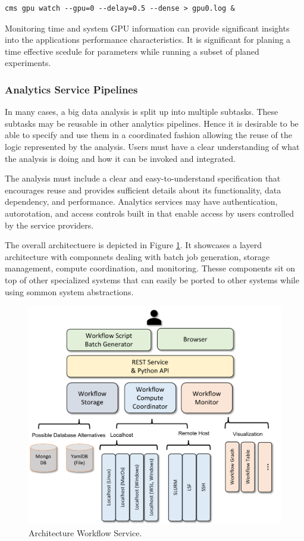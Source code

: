 \documentclass[utf8]{FrontiersinVancouver} %
\begin{document}
{\footnotesize
\begin{Verbatim}[commandchars=\\\{\}]
    cms gpu watch --gpu=0 --delay=0.5 --dense > gpu0.log &
\end{Verbatim}
}

Monitoring time and system GPU information can provide significant
insights into the applications performance characteristics. It is
significant for planing a time effective scedule for parameters while
running a subset of planed experiments.



\subsubsection{Analytics Service Pipelines}

In many cases, a big data analysis is split up into multiple
subtasks. These subtasks may be reusable in other analytics
pipelines. Hence it is desirable to be able to specify and use them in
a coordinated fashion allowing the reuse of the logic represented by
the analysis. Users must have a clear understanding of what the
analysis is doing and how it can be invoked and integrated.

The analysis must include a clear and easy-to-understand specification
that encourages reuse and provides sufficient details about its
functionality, data dependency, and performance. Analytics services
may have authentication, autorotation, and access controls built in
that enable access by users controlled by the service providers.

The overall architectuere is depicted in Figure \ref{fig:cc-2}. It
showcases a layerd architecture with componnets dealing with batch job
generation, storage management, compute coordination, and
monitoring. Thesse components sit on top of other specialized systems
that can easily be ported to other systems while using sommon system
abstractions.


\begin{figure}[htb]
    \centering
    \includegraphics[width=0.50\columnwidth]{images/cloudmesh-cc-new.pdf}
    \caption{Architecture Workflow Service.}
    \label{fig:cc-2}
\end{figure}
\end{document}
